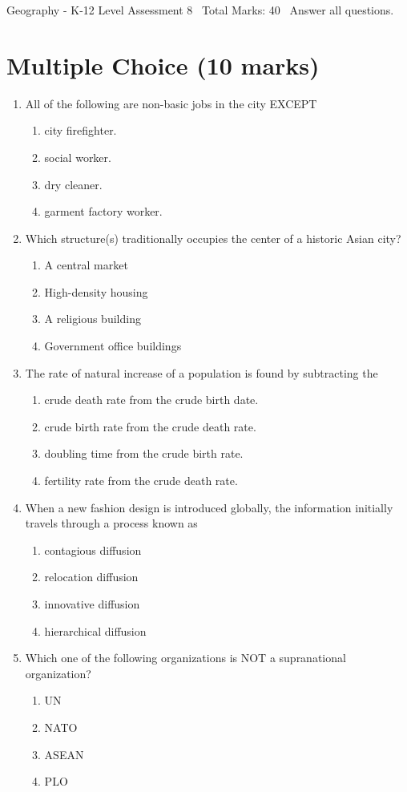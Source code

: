 \documentclass[12pt]{article}
\begin{document}
\begin{center}
Geography - K-12 Level Assessment 8 \
Total Marks: 40 \
Answer all questions.
\end{center}

\section*{Multiple Choice (10 marks)}
\begin{enumerate}[label=\arabic*.]
\item All of the following are non-basic jobs in the city EXCEPT
\begin{enumerate}[label=(\alph*)]
    \item city firefighter.
    \item social worker.
    \item dry cleaner.
    \item garment factory worker.
\end{enumerate}
\item Which structure(s) traditionally occupies the center of a historic Asian city?
\begin{enumerate}[label=(\alph*)]
    \item A central market
    \item High-density housing
    \item A religious building
    \item Government office buildings
\end{enumerate}
\item The rate of natural increase of a population is found by subtracting the
\begin{enumerate}[label=(\alph*)]
    \item crude death rate from the crude birth date.
    \item crude birth rate from the crude death rate.
    \item doubling time from the crude birth rate.
    \item fertility rate from the crude death rate.
\end{enumerate}
\item When a new fashion design is introduced globally, the information initially travels through a process known as
\begin{enumerate}[label=(\alph*)]
    \item contagious diffusion
    \item relocation diffusion
    \item innovative diffusion
    \item hierarchical diffusion
\end{enumerate}
\item Which one of the following organizations is NOT a supranational organization?
\begin{enumerate}[label=(\alph*)]
    \item UN
    \item NATO
    \item ASEAN
    \item PLO
\end{enumerate}
\end{enumerate}
\end{document}

